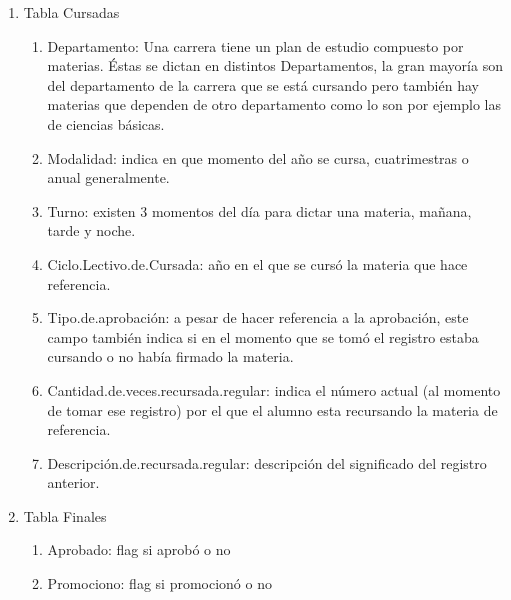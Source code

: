 \begin{enumerate}
	\item Tabla Cursadas
	\begin{enumerate}
		\item Departamento: Una carrera tiene un plan de estudio compuesto por materias. Éstas se dictan en distintos Departamentos, la gran mayoría son del departamento de la carrera que se está cursando pero también hay materias que dependen de otro departamento como lo son por ejemplo las de ciencias básicas.
		\item Modalidad: indica en que momento del año se cursa, cuatrimestras o anual generalmente.
		\item Turno: existen 3 momentos del día para dictar una materia, mañana, tarde y noche.
		\item Ciclo.Lectivo.de.Cursada: año en el que se cursó la materia que hace referencia.
		\item Tipo.de.aprobación: a pesar de hacer referencia a la aprobación, este campo también indica si en el momento que se tomó el registro estaba cursando o no había firmado la materia.
		\item Cantidad.de.veces.recursada.regular: indica el número actual (al momento de tomar ese registro) por el que el alumno esta recursando la materia de referencia.
		\item Descripción.de.recursada.regular: descripción del significado del registro anterior.
	\end{enumerate}
	\item Tabla Finales
	\begin{enumerate}
		\item Aprobado: flag si aprobó o no
		\item Promociono: flag si promocionó o no
	\end{enumerate}
\end{enumerate}




